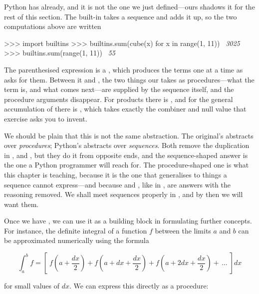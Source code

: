 \begin{revealTheSurface}
Python has  already, and it is not the one we just defined---ours
shadows it for the rest of this section.  The built-in takes a sequence and
adds it up, so the two computations above are written

\begin{codeBlock}
>>> import builtins
>>> builtins.sum(cube(x) for x in range(1, 11))
~\textit{3025}~
>>> builtins.sum(range(1, 11))
~\textit{55}~
\end{codeBlock}

\noindent
The parenthesised expression is a , which produces the
terms one at a time as  asks for them.  Between it and ,
the two things our  takes as procedures---what the term is, and what
comes next---are supplied by the sequence itself, and the procedure arguments
disappear.  For products there is , and for the general
accumulation of  there is , which
takes exactly the combiner and null value that exercise asks you to invent.

We should be plain that this is not the same abstraction.  The original's
 abstracts over \emph{procedures}; Python's abstracts over
\emph{sequences}.  Both remove the duplication in ,
 and , but they do it from opposite ends, and
the sequence-shaped answer is the one a Python programmer will reach for.  The
procedure-shaped one is what this chapter is teaching, because it is the one
that generalises to things a sequence cannot express---and because
 and , like  in
, are answers with the reasoning removed.  We shall meet
sequences properly in , and by then we will want them.
\end{revealTheSurface}

\noindent
Once we have , we can use it as a building block in formulating
further concepts.  For instance, the definite integral of a function \( f \)
between the limits \( a \) and \( b \) can be approximated numerically using the
formula

$${\int_a^b \!\!\! f} = {\left[\;f\! \left(a + \frac{dx}{2}\right)
		+ f\! \left(a + dx + \frac{dx}{2}\right)
		+ f\! \left(a + 2dx + \frac{dx}{2}\right) + \,\dots \;\right]\! dx} $$

\noindent
for small values of \( dx \).  We can express this directly as a procedure:

